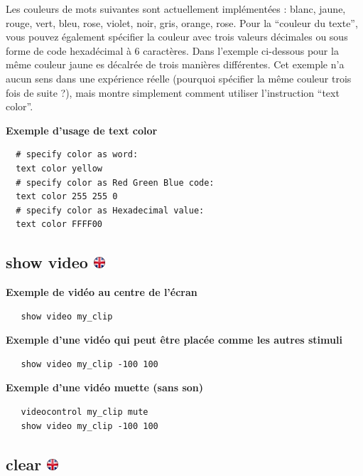\documentclass[
]{book}
\begin{document}
Les couleurs de mots suivantes sont actuellement implémentées : blanc,
jaune, rouge, vert, bleu, rose, violet, noir, gris, orange, rose. Pour
la ``couleur du texte'', vous pouvez également spécifier la couleur avec
trois valeurs décimales ou sous forme de code hexadécimal à 6
caractères. Dans l'exemple ci-dessous pour la même couleur jaune es
décalrée de trois manières différentes. Cet exemple n'a aucun sens dans
une expérience réelle (pourquoi spécifier la même couleur trois fois de
suite ?), mais montre simplement comment utiliser l'instruction ``text
color''.

\textbf{Exemple d'usage de text color}

\begin{verbatim}
  # specify color as word:
  text color yellow
  # specify color as Red Green Blue code:
  text color 255 255 0
  # specify color as Hexadecimal value:
  text color FFFF00
\end{verbatim}

\hypertarget{show-video}{%
\subsection[show video ]{\texorpdfstring{show video
\href{https://www.psytoolkit.org/doc3.2.0/syntax.html\#task-show-video}{\protect\includegraphics{img/ukflag.png}}}{show video }}\label{show-video}}

\textbf{Exemple de vidéo au centre de l'écran}

\begin{verbatim}
   show video my_clip
\end{verbatim}

\textbf{Exemple d'une vidéo qui peut être placée comme les autres
stimuli}

\begin{verbatim}
   show video my_clip -100 100
\end{verbatim}

\textbf{Exemple d'une vidéo muette (sans son)}

\begin{verbatim}
   videocontrol my_clip mute
   show video my_clip -100 100
\end{verbatim}

\hypertarget{clear}{%
\subsection[clear ]{\texorpdfstring{clear
\href{https://www.psytoolkit.org/doc3.2.0/syntax.html\#task-clear}{\protect\includegraphics{img/ukflag.png}}}{clear }}\label{clear}}
\end{document}
